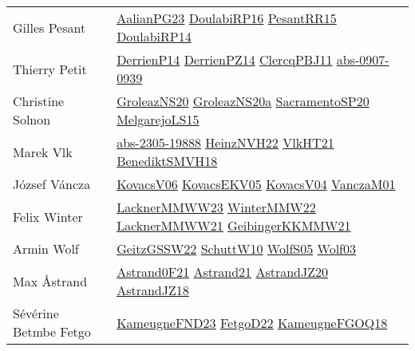 {\begin{longtable}{p{4cm}p{20cm}}
Gilles Pesant & \href{papers/AalianPG23.pdf}{AalianPG23}\cite{AalianPG23} \href{}{DoulabiRP16}\cite{DoulabiRP16} \href{papers/PesantRR15.pdf}{PesantRR15}\cite{PesantRR15} \href{papers/DoulabiRP14.pdf}{DoulabiRP14}\cite{DoulabiRP14} \\
Thierry Petit & \href{papers/DerrienP14.pdf}{DerrienP14}\cite{DerrienP14} \href{papers/DerrienPZ14.pdf}{DerrienPZ14}\cite{DerrienPZ14} \href{papers/ClercqPBJ11.pdf}{ClercqPBJ11}\cite{ClercqPBJ11} \href{articles/abs-0907-0939.pdf}{abs-0907-0939}\cite{abs-0907-0939} \\
Christine Solnon & \href{papers/GroleazNS20.pdf}{GroleazNS20}\cite{GroleazNS20} \href{papers/GroleazNS20a.pdf}{GroleazNS20a}\cite{GroleazNS20a} \href{articles/SacramentoSP20.pdf}{SacramentoSP20}\cite{SacramentoSP20} \href{papers/MelgarejoLS15.pdf}{MelgarejoLS15}\cite{MelgarejoLS15} \\
Marek Vlk & \href{articles/abs-2305-19888.pdf}{abs-2305-19888}\cite{abs-2305-19888} \href{articles/HeinzNVH22.pdf}{HeinzNVH22}\cite{HeinzNVH22} \href{articles/VlkHT21.pdf}{VlkHT21}\cite{VlkHT21} \href{papers/BenediktSMVH18.pdf}{BenediktSMVH18}\cite{BenediktSMVH18} \\
J{\'{o}}zsef V{\'{a}}ncza & \href{papers/KovacsV06.pdf}{KovacsV06}\cite{KovacsV06} \href{papers/KovacsEKV05.pdf}{KovacsEKV05}\cite{KovacsEKV05} \href{papers/KovacsV04.pdf}{KovacsV04}\cite{KovacsV04} \href{papers/VanczaM01.pdf}{VanczaM01}\cite{VanczaM01} \\
Felix Winter & \href{articles/LacknerMMWW23.pdf}{LacknerMMWW23}\cite{LacknerMMWW23} \href{papers/WinterMMW22.pdf}{WinterMMW22}\cite{WinterMMW22} \href{papers/LacknerMMWW21.pdf}{LacknerMMWW21}\cite{LacknerMMWW21} \href{papers/GeibingerKKMMW21.pdf}{GeibingerKKMMW21}\cite{GeibingerKKMMW21} \\
Armin Wolf & \href{papers/GeitzGSSW22.pdf}{GeitzGSSW22}\cite{GeitzGSSW22} \href{papers/SchuttW10.pdf}{SchuttW10}\cite{SchuttW10} \href{papers/WolfS05.pdf}{WolfS05}\cite{WolfS05} \href{papers/Wolf03.pdf}{Wolf03}\cite{Wolf03} \\
Max {\AA}strand & \href{papers/Astrand0F21.pdf}{Astrand0F21}\cite{Astrand0F21} \href{}{Astrand21}\cite{Astrand21} \href{articles/AstrandJZ20.pdf}{AstrandJZ20}\cite{AstrandJZ20} \href{papers/AstrandJZ18.pdf}{AstrandJZ18}\cite{AstrandJZ18} \\
S{\'{e}}v{\'{e}}rine Betmbe Fetgo & \href{papers/KameugneFND23.pdf}{KameugneFND23}\cite{KameugneFND23} \href{articles/FetgoD22.pdf}{FetgoD22}\cite{FetgoD22} \href{papers/KameugneFGOQ18.pdf}{KameugneFGOQ18}\cite{KameugneFGOQ18} \\

\end{longtable}}
